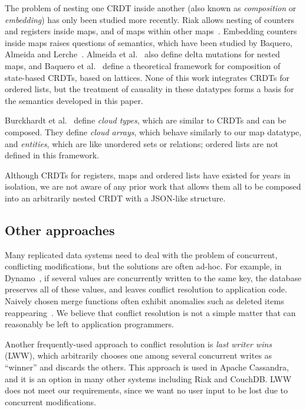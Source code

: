 \documentclass[10pt,journal,compsoc]{IEEEtran}
\begin{document}
The problem of nesting one CRDT inside another (also known as \emph{composition} or \emph{embedding}) has only been studied more recently. Riak allows nesting of counters and registers inside maps, and of maps within other maps~\cite{Brown:2014hs,Brown:2013wy}. Embedding counters inside maps raises questions of semantics, which have been studied by Baquero, Almeida and Lerche~\cite{Baquero:2016iv}. Almeida et al.~\cite{Almeida:2016tk} also define delta mutations for nested maps, and Baquero et al.~\cite{Baquero:2015tm} define a theoretical framework for composition of state-based CRDTs, based on lattices. None of this work integrates CRDTs for ordered lists, but the treatment of causality in these datatypes forms a basis for the semantics developed in this paper.

Burckhardt et al.~\cite{Burckhardt:2012jy} define \emph{cloud types}, which are similar to CRDTs and can be composed. They define \emph{cloud arrays}, which behave similarly to our map datatype, and \emph{entities}, which are like unordered sets or relations; ordered lists are not defined in this framework.

Although CRDTs for registers, maps and ordered lists have existed for years in isolation, we are not aware of any prior work that allows them all to be composed into an arbitrarily nested CRDT with a JSON-like structure.

\subsection{Other approaches}\label{sec:related-other}

Many replicated data systems need to deal with the problem of concurrent, conflicting modifications, but the solutions are often ad-hoc. For example, in Dynamo~\cite{DeCandia:2007ui}, if several values are concurrently written to the same key, the database preserves all of these values, and leaves conflict resolution to application code. Naively chosen merge functions often exhibit anomalies such as deleted items reappearing~\cite{DeCandia:2007ui}. We believe that conflict resolution is not a simple matter that can reasonably be left to application programmers.

Another frequently-used approach to conflict resolution is \emph{last writer wins} (LWW), which arbitrarily chooses one among several concurrent writes as ``winner'' and discards the others. This approach is used in Apache Cassandra, and it is an option in many other systems including Riak and CouchDB. LWW does not meet our requirements, since we want no user input to be lost due to concurrent modifications.
\end{document}
